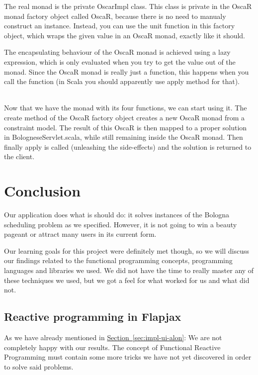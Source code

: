 \documentclass[a4paper]{article}
\begin{document}
The real monad is the private OscarImpl class.
This class is private in the OscaR monad factory object called OscaR,
because there is no need to manualy construct an instance.
Instead, you can use the unit function in this factory object,
which wraps the given value in an OscaR monad, exactly like it should.

The encapsulating behaviour of the OscaR monad is achieved using a
lazy expression, 
which is only evaluated when you try to get the value out of the monad.
Since the OscaR monad is really just a function, 
this happens when you call the function 
(in Scala you should apparently use apply method for that).

\hspace*{1em}\\
Now that we have the monad with its four functions,
we can start using it.
The create method of the OscaR factory object creates a new OscaR monad
from a constraint model.
The result of this OscaR is then mapped to a proper solution in BologneseServlet.scala,
while still remaining inside the OscaR monad.
Then finally apply is called (unleashing the side-effects) 
and the solution is returned to the client.

\newpage


\section{Conclusion}
\label{sec:conclusion}
Our application does what is should do:
it solves instances of the Bologna scheduling problem as we specified.
However, it is not going to win a beauty pageant or attract many users in its 
current form.

Our learning goals for this project were definitely met though,
so we will discuss our findings related to the functional programming concepts,
programming languages and libraries we used.
We did not have the time to really master any of these techniques we used,
but we got a feel for what worked for us and what did not.

\subsection{Reactive programming in Flapjax}
As we have already mentioned in 
\hyperref[sec:impl-ui-alon]{Section~\ref*{sec:impl-ui-alon}}:
We are not completely happy with our results.
The concept of Functional Reactive Programming must contain some more tricks we
have not yet discovered in order to solve said problems. 
\end{document}
